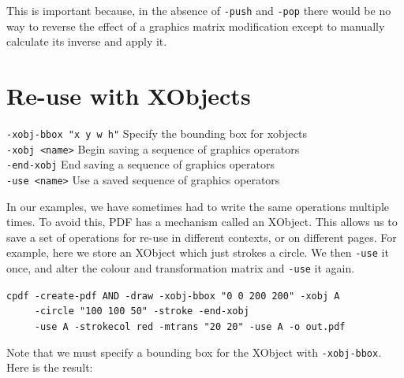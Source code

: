 \documentclass{book}
\begin{document}
\noindent This is important because, in the absence of \texttt{-push} and \texttt{-pop} there would be no way to reverse the effect of a graphics matrix modification except to manually calculate its inverse and apply it.

\section{Re-use with XObjects}
  {\small\begin{framed}
   \vspace{1.5mm}
   \noindent\verb!-xobj-bbox "x y w h"! Specify the bounding box for xobjects\\
   \noindent\verb!-xobj <name>! Begin saving a sequence of graphics operators\\
   \noindent\verb!-end-xobj! End saving a sequence of graphics operators\\
   \noindent\verb!-use <name>! Use a saved sequence of graphics operators
  \end{framed}}

In our examples, we have sometimes had to write the same operations multiple times. To avoid this, PDF has a mechanism called an XObject. This allows us to save a set of operations for re-use in different contexts, or on different pages. For example, here we store an XObject which just strokes a circle. We then \texttt{-use} it once, and alter the colour and transformation matrix and \texttt{-use} it again.

\begin{framed}
 \noindent\small\verb?cpdf -create-pdf AND -draw -xobj-bbox "0 0 200 200" -xobj A?\\
 \noindent\small\verb?     -circle "100 100 50" -stroke -end-xobj?\\
 \noindent\small\verb?     -use A -strokecol red -mtrans "20 20" -use A -o out.pdf?
\end{framed}

\noindent Note that we must specify a bounding box for the XObject with \texttt{-xobj-bbox}. Here is the result:

\bigskip
{}
\bigskip
\end{document}
